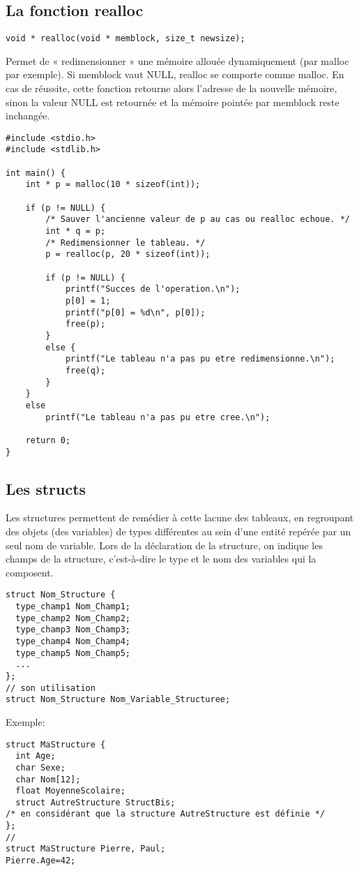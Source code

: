 \documentclass[a4paper]{article}
\begin{document}
\subsection{La fonction realloc}
\begin{lstlisting}
void * realloc(void * memblock, size_t newsize);
\end{lstlisting}
Permet de « redimensionner » une mémoire allouée dynamiquement (par malloc par exemple). Si memblock vaut NULL, realloc se comporte comme malloc. En cas de réussite, cette fonction retourne alors l'adresse de la nouvelle mémoire, sinon la valeur NULL est retournée et la mémoire pointée par memblock reste inchangée.
\begin{lstlisting}
#include <stdio.h>
#include <stdlib.h>

int main() {
    int * p = malloc(10 * sizeof(int));

    if (p != NULL) {
        /* Sauver l'ancienne valeur de p au cas ou realloc echoue. */
        int * q = p;
        /* Redimensionner le tableau. */
        p = realloc(p, 20 * sizeof(int));

        if (p != NULL) {
            printf("Succes de l'operation.\n");
            p[0] = 1;
            printf("p[0] = %d\n", p[0]);
            free(p);
        }
        else {
            printf("Le tableau n'a pas pu etre redimensionne.\n");
            free(q);
        }
    }
    else
        printf("Le tableau n'a pas pu etre cree.\n");

    return 0;
}
\end{lstlisting}
\subsection{Les structs}
Les structures permettent de remédier à cette lacune des tableaux, en regroupant des objets (des variables) de types différentes au sein d'une entité repérée par un seul nom de variable. \newline
Lors de la déclaration de la structure, on indique les champs de la structure, c'est-à-dire le type et le nom des variables qui la composent.
\begin{lstlisting}
struct Nom_Structure {
  type_champ1 Nom_Champ1;
  type_champ2 Nom_Champ2;
  type_champ3 Nom_Champ3;
  type_champ4 Nom_Champ4;
  type_champ5 Nom_Champ5;
  ...
};
// son utilisation
struct Nom_Structure Nom_Variable_Structuree;
\end{lstlisting}
Exemple:
\begin{lstlisting}
struct MaStructure {
  int Age;
  char Sexe;
  char Nom[12];
  float MoyenneScolaire;
  struct AutreStructure StructBis;
/* en considérant que la structure AutreStructure est définie */
};
//
struct MaStructure Pierre, Paul;
Pierre.Age=42;
\end{lstlisting}
\end{document}
